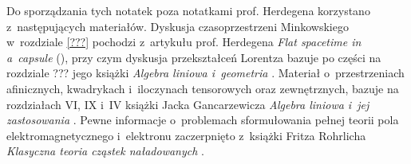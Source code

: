 \documentclass[a4paper,11pt]{article}
\numberwithin{equation}{section}
\begin{document}
Do sporządzania tych notatek poza notatkami prof. Herdegena korzystano
z~następujących materiałów. Dyskusja czasoprzestrzeni Minkowskiego w~rozdziale \eqref{???} pochodzi z~artykułu prof. Herdegena
\textit{Flat spacetime in a~capsule}
(\parencite{Herdegen-Flat-spacetime-in-a-capsule-Pub-2009}), przy czym
dyskusja przekształceń Lorentza bazuje po części na rozdziale ??? jego
książki \textit{Algebra liniowa i~geometria}
\parencite{Herdegen-Algebra-liniowa-i-geometria-Pub-2010}. Materiał
o~przestrzeniach afinicznych, kwadrykach i~iloczynach tensorowych oraz
zewnętrznych, bazuje na rozdziałach VI, IX i~IV książki Jacka Gancarzewicza
\textit{Algebra liniowa i~jej zastosowania}
\parencite{Gancarzewicz-Algebra-liniowa-i-jej-zastosowania-ETC-Pub-2004}.
Pewne informacje o~problemach sformułowania pełnej teorii pola
elektromagnetycznego i~elektronu zaczerpnięto z~książki Fritza Rohrlicha
\textit{Klasyczna teoria cząstek naładowanych}
\parencite{Rohrlich-Klasyczna-teoria-czastek-naladowanych-Pub-1981}.

























\printbibliography





\end{document}
